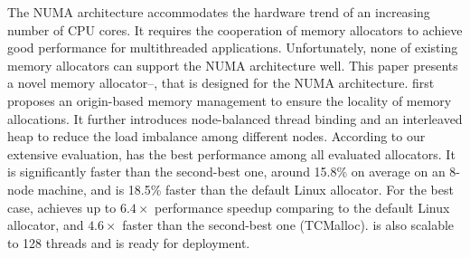 
The NUMA architecture accommodates the hardware trend of an increasing number of CPU cores. It requires the cooperation of memory allocators to achieve good performance for multithreaded applications. Unfortunately, none of existing memory allocators can support the NUMA architecture well.
This paper presents a novel memory allocator--\NM{}, that is designed for the NUMA architecture. \NM{} first proposes an origin-based memory management to ensure the locality of memory allocations. It further introduces node-balanced thread binding and an interleaved heap to reduce the load imbalance among different nodes. 
According to our extensive evaluation, \NM{} has the best performance among all evaluated allocators. It is significantly faster than the second-best one, around 15.8\% on average on an 8-node machine, and is 18.5\% faster than the default Linux allocator. For the best case, \NM{} achieves up to $6.4\times$ performance speedup comparing to the default Linux allocator, and $4.6\times$ faster than the second-best one (TCMalloc). \NM{} is also scalable to 128 threads and is ready for deployment.